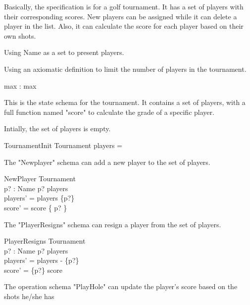 \documentclass{llncs}
\begin{document}
Basically, the specification is for a golf tournament. It has a set of players with their corresponding 
scores. New players can be assigned while it can delete a player in the list. Also, it can calculate 
the score for each player based on their own shots.


Using Name as a set to present players.
\begin{zed}
[Name]
\end{zed}
Using an axiomatic definition to limit the number of players in the tournament.
\begin{axdef}
max : \nat
\where max 
\end{axdef}
This is the state schema for the tournament. It contains a set of players, with a full function 
named "score" to calculate the grade of a specific player.

Intially, the set of players is empty.
\begin{schema}{TournamentInit}
Tournament
\where players = \emptyset
\end{schema}

The "Newplayer" schema can add a new player to the set of players.
\begin{schema}{NewPlayer}
\Delta Tournament \\
p? : Name
\where p? \notin players \\
players' = players \cup \{p?\} \\
score' = score \cup \{ p?  \}
\end{schema}

The "PlayerResigns" schema can resign a player from the set of players.
\begin{schema}{PlayerResigns}
\Delta Tournament \\
p? : Name
\where p? \in players\\
players' = players - \{p?\} \\
score' = \{p?\} \ndres score
\end{schema}

The operation schema "PlayHole" can update the player's score based on the shots he/she has
\end{document}

